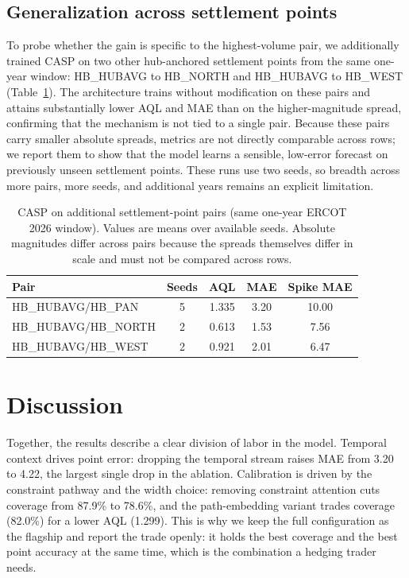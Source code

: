 \documentclass{article}
\begin{document}
\subsection{Generalization across settlement points}
To probe whether the gain is specific to the highest-volume pair, we additionally trained CASP on two other hub-anchored settlement points from the same one-year window: HB\_HUBAVG to HB\_NORTH and HB\_HUBAVG to HB\_WEST (Table~\ref{tab:gen}). The architecture trains without modification on these pairs and attains substantially lower AQL and MAE than on the higher-magnitude spread, confirming that the mechanism is not tied to a single pair. Because these pairs carry smaller absolute spreads, metrics are not directly comparable across rows; we report them to show that the model learns a sensible, low-error forecast on previously unseen settlement points. These runs use two seeds, so breadth across more pairs, more seeds, and additional years remains an explicit limitation.

\begin{table}[ht]
\centering
\caption{CASP on additional settlement-point pairs (same one-year ERCOT 2026 window). Values are means over available seeds. Absolute magnitudes differ across pairs because the spreads themselves differ in scale and must not be compared across rows.}
\label{tab:gen}
\begin{tabular}{lcccc}
\toprule
\textbf{Pair} & \textbf{Seeds} & \textbf{AQL} & \textbf{MAE} & \textbf{Spike MAE} \\
\midrule
HB\_HUBAVG/HB\_PAN   & 5 & 1.335 & 3.20 & 10.00 \\
HB\_HUBAVG/HB\_NORTH & 2 & 0.613 & 1.53 & 7.56 \\
HB\_HUBAVG/HB\_WEST  & 2 & 0.921 & 2.01 & 6.47 \\
\bottomrule
\end{tabular}
\end{table}

\section{Discussion}
\label{sec:discussion}

Together, the results describe a clear division of labor in the model. Temporal context drives point error: dropping the temporal stream raises MAE from 3.20 to 4.22, the largest single drop in the ablation. Calibration is driven by the constraint pathway and the width choice: removing constraint attention cuts coverage from 87.9\% to 78.6\%, and the path-embedding variant trades coverage (82.0\%) for a lower AQL (1.299). This is why we keep the full configuration as the flagship and report the trade openly: it holds the best coverage and the best point accuracy at the same time, which is the combination a hedging trader needs.
\end{document}
